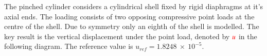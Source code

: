 The pinched cylinder considers a cylindrical shell fixed by rigid diaphragms at it's axial ends. The loading consists of two opposing compressive point loads at the centre of the shell. Due to symmetry only an eighth of the shell is modelled. The key result is the vertical displacement under the point load, denoted by $\textcolor{red}{u}$ in the following diagram. The reference value is $u_{ref} =  1.8248\ \times\ 10^{-5}$. 